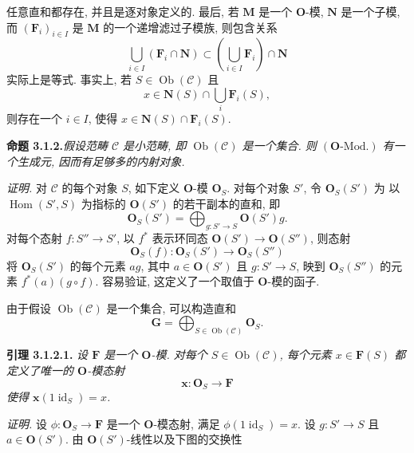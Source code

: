 任意直和都存在, 并且是逐对象定义的. 最后, 若
\(\mathbf M\) 是一个 \(\mathbf O\)-模, \(\mathbf N\) 是一个子模,
而 \((\mathbf F_i)_{i\in I}\) 是 \(\mathbf M\) 的一个递增滤过子模族, 则包含关系
\[
  \bigcup_{i\in I}(\mathbf F_i\cap\mathbf N)
    \subset
  \left(\bigcup_{i\in I}\mathbf F_i\right)\cap\mathbf N
\]
实际上是等式. 事实上, 若 \(S\in\operatorname{Ob}(\mathscr C)\) 且
\[
  x\in\mathbf N(S)\cap\bigcup_i\mathbf F_i(S),
\]
则存在一个 \(i\in I\), 使得
\(x\in\mathbf N(S)\cap\mathbf F_i(S)\).

\medskip
\noindent{}\textbf{命题 3.1.2.}\footnotemark[\value{footnote}]
\textit{假设范畴 \(\mathscr C\) 是小范畴, 即
\(\operatorname{Ob}(\mathscr C)\) 是一个集合.
则 \((\mathbf O\text{-Mod.})\) 有一个生成元, 因而有足够多的内射对象.}

\textit{证明.}
对 \(\mathscr C\) 的每个对象 \(S\), 如下定义 \(\mathbf O\)-模
\(\mathbf O_S\). 对每个对象 \(S'\), 令 \(\mathbf O_S(S')\) 为
以 \(\operatorname{Hom}(S',S)\) 为指标的 \(\mathbf O(S')\) 的若干副本的直和, 即
\[
  \mathbf O_S(S')
    =\bigoplus_{g:S'\to S}\mathbf O(S')g.
\]
对每个态射 \(f:S''\to S'\), 以 \(f^*\) 表示环同态
\(\mathbf O(S')\to\mathbf O(S'')\), 则态射
\[
  \mathbf O_S(f):\mathbf O_S(S')\longrightarrow\mathbf O_S(S'')
\]
将 \(\mathbf O_S(S')\) 的每个元素 \(ag\), 其中
\(a\in\mathbf O(S')\) 且 \(g:S'\to S\), 映到 \(\mathbf O_S(S'')\)
的元素 \(f^*(a)(g\circ f)\). 容易验证, 这定义了一个取值于
\(\mathbf O\)-模的函子.

由于假设 \(\operatorname{Ob}(\mathscr C)\) 是一个集合, 可以构造直和
\[
  \mathbf G=\bigoplus_{S\in\operatorname{Ob}(\mathscr C)}\mathbf O_S.
\]

\medskip
\noindent{}\textbf{引理 3.1.2.1.}
\textit{设 \(\mathbf F\) 是一个 \(\mathbf O\)-模.
对每个 \(S\in\operatorname{Ob}(\mathscr C)\), 每个元素
\(x\in\mathbf F(S)\) 都定义了唯一的 \(\mathbf O\)-模态射
\[
  \mathbf x:\mathbf O_S\longrightarrow\mathbf F
\]
使得 \(\mathbf x(1\operatorname{id}_S)=x\).}

\textit{证明.}
设 \(\phi:\mathbf O_S\to\mathbf F\) 是一个 \(\mathbf O\)-模态射,
满足 \(\phi(1\operatorname{id}_S)=x\).
设 \(g:S'\to S\) 且 \(a\in\mathbf O(S')\).
由 \(\mathbf O(S')\)-线性以及下图的交换性

